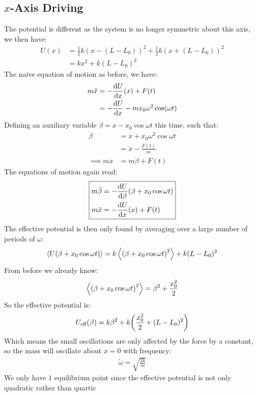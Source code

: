 \subsection{$x$-Axis Driving}
The potential is different as the system is no longer symmetric about this axis, we then have:
\begin{align*}
  U(x)&=\frac12k(x-(L-L_0))^2+\frac12k(x+(L-L_0))^2\\
  &=\boxed{kx^2+k(L-L_0)^2}
\end{align*}
The naive equation of motion as before, we have:
\begin{align*}
  m\ddot{x}&=-\dv{U}{x}\qty(x)+F(t)\\
  &=-\dv{U}{x}(x)-mx_0\omega^2\cos(\omega t)
\end{align*}
Defining an auxiliary variable $\beta=x-x_0\cos\omega t$ this time, such that:
\begin{align*}
  \ddot{\beta}&=\ddot{x}+x_0\omega^2\cos\omega t\\
  &=\ddot{x}-\frac{F(t)}{m}\\
  \implies m\ddot{x}&=m\ddot{\beta}+F(t)
\end{align*}
The equations of motion again read:
\begin{align}
  \boxed{\begin{aligned}
      m\ddot{\beta}&=-\dv{U}{\beta}\qty(\beta+x_0\cos\omega t)\\
      m\ddot{x}&=-\dv{U}{x}\qty(x)+F(t)
    \end{aligned}}
\end{align}
The effective potential is then only found by averaging over a large number of periods of $\omega$:
\begin{align*}
  \ev{U(\beta+x_0\cos\omega t)}=k\ev{\qty(\beta+x_0\cos\omega t)^2}
  +k(L-L_0)^2
\end{align*}
From before we already know:
\begin{align*}
  \ev{\qty(\beta+x_0\cos\omega t)^2}=\beta^2+\frac{x_0^2}{2}
\end{align*}
So the effective potential is:
\begin{align*}
  U_{\text{eff}}(\beta)=k\beta^2+k\qty(\frac{x_0^2}2+(L-L_0)^2)
\end{align*}
Which means the small oscillations are only affected by the force by a constant, so the mass will oscillate about $x=0$ with frequency:
\begin{align}
  \boxed{\tilde{\omega}=\sqrt{\frac{2k}{m}}}
\end{align}
We only have $1$ equilibrium point since the effective potential is not only quadratic rather than quartic
